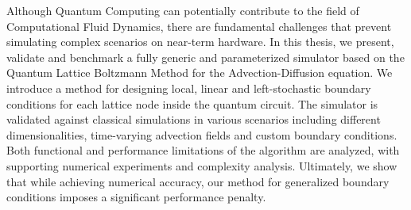 Although Quantum Computing can potentially contribute to the field of Computational Fluid Dynamics, there are fundamental challenges that prevent simulating complex scenarios on near-term hardware. 
In this thesis, we present, validate and benchmark a fully generic and parameterized simulator based on the Quantum Lattice Boltzmann Method for the Advection-Diffusion equation.
We introduce a method for designing local, linear and left-stochastic boundary conditions for each lattice node inside the quantum circuit.  
The simulator is validated against classical simulations in various scenarios including different dimensionalities, time-varying advection fields and custom boundary conditions.
Both functional and performance limitations of the algorithm are analyzed, with supporting numerical experiments and complexity analysis. 
Ultimately, we show that while achieving numerical accuracy, our method for generalized boundary conditions imposes a significant performance penalty.